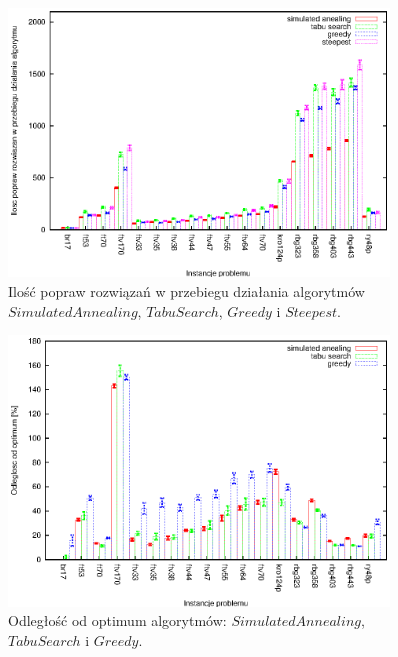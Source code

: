 \begin{figure}
\begin{center}
\includegraphics[width=0.9\textwidth]{wykresy/anealing_tabu_greedy_better}
\end{center}
\caption{Ilość popraw rozwiązań w przebiegu działania algorytmów 
$Simulated Annealing$, $Tabu Search$, $Greedy$ i $Steepest$.}
\label{anealing_tabu_greedy_better}
\end{figure}

\begin{figure}
\begin{center}
\includegraphics[width=0.9\textwidth]{wykresy/anealing_tabu_greedy_quality}
\end{center}
\caption{Odległość od optimum algorytmów: 
$Simulated Annealing$, $Tabu Search$ i $Greedy$.}
\label{anealing_tabu_greedy_quality}
\end{figure}

